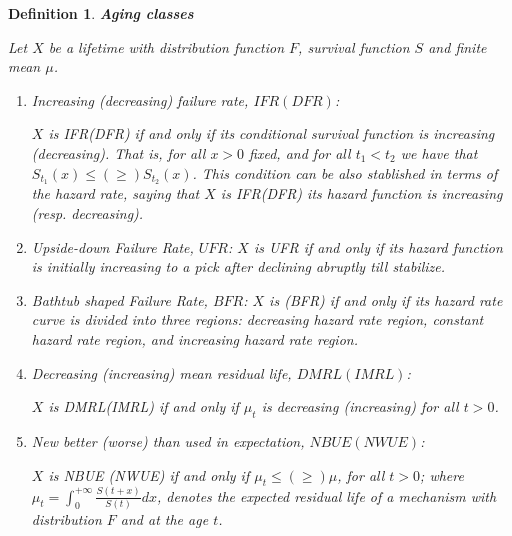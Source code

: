 \documentclass[preprint,12pt]{elsarticle}
\newtheorem{dfn}{{\sc Definition}}[section]
\begin{document}
\begin{dfn} {\bf Aging classes}

\noindent Let $X$ be a lifetime with distribution function $F$, survival function $S$ and finite mean $\mu$.

\begin{enumerate}
\item Increasing (decreasing) failure rate, $IFR(DFR)$:

\noindent $X$ is {\it IFR}({\it DFR}) if and only if its conditional survival function is increasing (decreasing). That is, for all $x>0 $ fixed, and for all $t_1 < t_2$ we have that $S_{t_1}(x) \leq (\geq) S_{t_2}(x) $. This condition can be also stablished in terms of the hazard rate, saying that $X$ is {\it IFR}({\it DFR}) its hazard function is increasing (resp. decreasing).

\item Upside-down Failure Rate, $UFR$:
\noindent $X$ is {\it UFR}  if and only if its hazard function is initially increasing to a pick after declining abruptly till stabilize.

\item Bathtub shaped Failure Rate, $BFR$:
\noindent $X$ is  ({\it BFR}) if and only if its  hazard rate curve is divided into three regions: decreasing hazard rate region, constant hazard rate region, and increasing hazard rate region.

\item Decreasing (increasing) mean residual life, $DMRL(IMRL)$:

 \noindent $X$ is {\it DMRL}({\it IMRL}) if and only if $\mu_t$ is decreasing (increasing) for all $t>0$.

\item New better (worse) than used in expectation, $NBUE(NWUE)$:

 \noindent $X$  is {\it NBUE} ({\it NWUE}) if and only if  $\mu_t \leq (\geq) \mu$, for all $t>0$; where $\mu_t=\int_0^{+\infty}\frac{S(t+x)}{S(t)}dx$, denotes the expected residual life of a mechanism with distribution $F$ and at the age $t$.

\end{enumerate}
\end{dfn}
\end{document}
